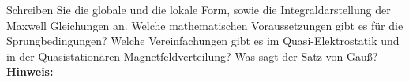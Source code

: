 \begin{question}[section=2,subsection=21,name={Maxwell Gleichungen},difficulty=4,type=mdl,tags={}]
	Schreiben Sie die globale und die lokale Form, sowie die Integraldarstellung der Maxwell Gleichungen an. Welche mathematischen Voraussetzungen gibt es für die Sprungbedingungen? Welche Vereinfachungen gibt es im Quasi-Elektrostatik und in der Quasistationären Magnetfeldverteilung? Was sagt der Satz von Gauß?
	\\ \textbf{Hinweis:}\\
	
\end{question}
\begin{solution}
	
\end{solution}